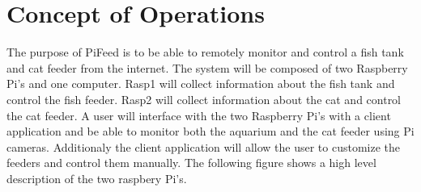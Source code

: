 




\usepackage[compact]{titlesec}





\section{Concept of Operations}
The purpose of PiFeed is to be able to remotely monitor and control a fish tank
and cat feeder from the internet. The system will be composed of two
Raspberry Pi's and one computer. Rasp1 will collect information about the fish
tank and control the fish feeder. Rasp2 will collect information about the cat
and control the cat feeder. A user will interface with the two Raspberry Pi's
with a client application and be able to monitor both the aquarium and the cat
feeder using Pi cameras. Additionaly the client application will allow the user
to customize the feeders and control them manually. The following figure shows
a high level description of the two raspbery Pi's.

